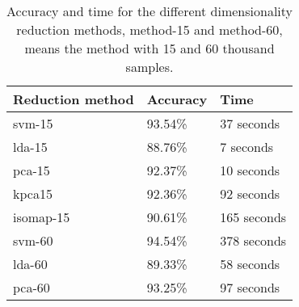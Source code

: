 \begin{table}
    \centering
    \begin{tabular}{lll}
        \hline
        Reduction method & Accuracy & Time \\
        \hline
        \gls{svm}-15 & 93.54\% & 37 seconds \\
        \gls{lda}-15 & 88.76\% & 7 seconds \\
        \gls{pca}-15 & 92.37\% & 10 seconds \\
        \gls{kpca}15 & 92.36\% & 92 seconds \\
        \gls{isomap}-15 & 90.61\% & 165 seconds \\
        \hline
        \gls{svm}-60 & 94.54\% & 378 seconds \\
        \gls{lda}-60 & 89.33\% & 58 seconds \\
        \gls{pca}-60 & 93.25\% & 97 seconds \\
        \hline
    \end{tabular}
    \caption{Accuracy and time for the different dimensionality reduction methods,  method-15 and method-60, means the method with 15 and 60 thousand samples.}
    \label{tab:discussion-experiment-1-accuracy}
    \end{table}